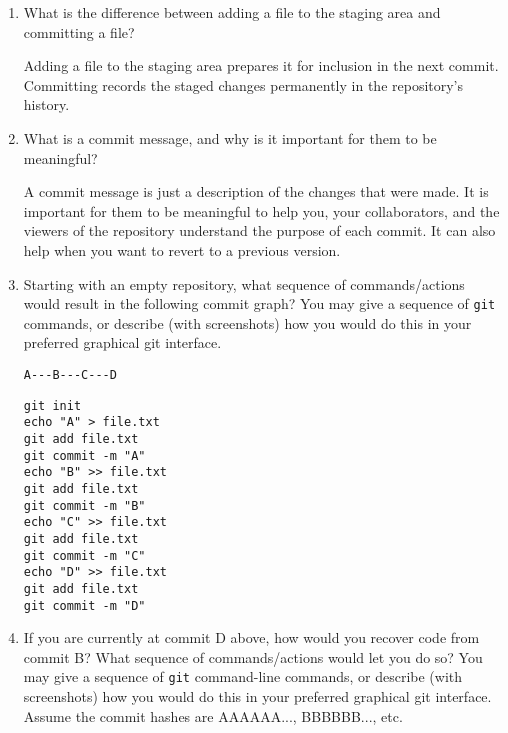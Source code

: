 \documentclass[10pt,twocolumn]{article}
\begin{document}
\begin{enumerate}
\item What is the difference between adding a file to the staging area and committing a file?

Adding a file to the staging area prepares it for inclusion in the next commit. Committing records the staged changes permanently in the repository's history.
\item What is a commit message, and why is it important for them to be meaningful?

A commit message is just a description of the changes that were made. It is important for them to be meaningful to help you, your collaborators, and the viewers of the repository understand the purpose of each commit. It can also help when you want to revert to a previous version.
\item Starting with an empty repository, what sequence of commands/actions would result in the following commit graph? You may give a sequence of \texttt{git} commands, or describe (with screenshots) how you would do this in your preferred graphical git interface.
\begin{verbatim}
A---B---C---D
\end{verbatim}

\texttt{git init}\\
\texttt{echo "A" > file.txt}\\
\texttt{git add file.txt}\\
\texttt{git commit -m "A"}\\
\texttt{echo "B" >> file.txt}\\
\texttt{git add file.txt}\\
\texttt{git commit -m "B"}\\
\texttt{echo "C" >> file.txt}\\
\texttt{git add file.txt}\\
\texttt{git commit -m "C"}\\
\texttt{echo "D" >> file.txt}\\
\texttt{git add file.txt}\\
\texttt{git commit -m "D"}\\

\item If you are currently at commit D above, how would you recover code from commit B? What sequence of commands/actions would let you do so? You may give a sequence of \texttt{git} command-line commands, or describe (with screenshots) how you would do this in your preferred graphical git interface. Assume the commit hashes are AAAAAA..., BBBBBB..., etc.


\end{enumerate}
\end{document}
